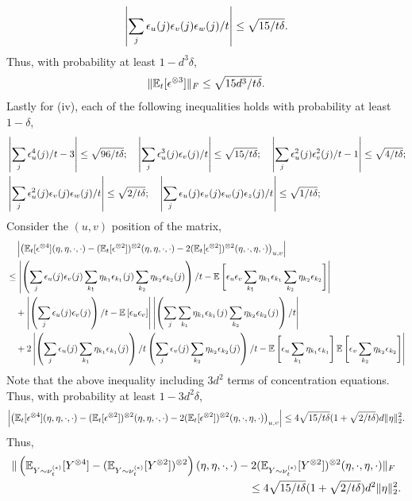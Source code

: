 \[
\left|\sum_j \epsilon_u(j)\epsilon_v(j)\epsilon_w(j)/t \right| \le \sqrt{15/t\delta}.
\]
Thus, with probability at least $1-d^3\delta$,
\[
\|\mathbb{E}_t[\epsilon^{\otimes 3}]\|_F \le \sqrt{15d^3/t\delta}.
\] 
Lastly for (iv), each of the following inequalities holds with probability at least $1-\delta$,
\begin{align*}
& \left| \sum_j\epsilon_u^4(j)/t -3 \right| \le \sqrt{96/t\delta}; \quad \left| \sum_j\epsilon_u^3(j)\epsilon_v(j)/t \right| \le \sqrt{15/t\delta}; \quad \left| \sum_j\epsilon_u^2(j)\epsilon_v^2(j)/t - 1\right| \le \sqrt{4/t\delta}; \\
&  \left| \sum_j\epsilon_u^2(j)\epsilon_v(j)\epsilon_w(j)/t \right| \le \sqrt{2/t\delta}; \quad \left| \sum_j\epsilon_u(j)\epsilon_v(j)\epsilon_w(j)\epsilon_z(j)/t \right| \le \sqrt{1/t\delta};
\end{align*}
Consider the $(u,v)$ position of the matrix,
\begin{align*}
& \quad \left|\left(\mathbb{E}_t[\epsilon^{\otimes4}](\eta,\eta,\cdot,\cdot) - (\mathbb{E}_t[\epsilon^{\otimes2}])^{\otimes 2}(\eta,\eta,\cdot,\cdot) - 2(\mathbb{E}_t[\epsilon^{\otimes2}])^{\otimes 2}(\eta,\cdot,\eta,\cdot) \right)_{u,v}\right|\\
& \le \left| \left(\sum_j \epsilon_u(j)\epsilon_v(j)\sum_{k_1}\eta_{k_1}\epsilon_{k_1}(j)\sum_{k_2}\eta_{k_2}\epsilon_{k_2}(j)\right)/t- \mathbb{E}\left[ \epsilon_{u}\epsilon_{v}\sum_{k_1}\eta_{k_1}\epsilon_{k_1}\sum_{k_2}\eta_{k_2}\epsilon_{k_2}\right]\right| \\ 
& \quad + \left| \left(\sum_j \epsilon_u(j)\epsilon_v(j)\right)/t -  \mathbb{E}\left[ \epsilon_{u}\epsilon_{v}\right]\right|\left|\left(\sum_j\sum_{k_1}\eta_{k_1}\epsilon_{k_1}(j)\sum_{k_2}\eta_{k_2}\epsilon_{k_2}(j)\right)/t \right| \\
& \quad + 2\left| \left(\sum_j \epsilon_u(j)\sum_{k_1}\eta_{k_1}\epsilon_{k_1}(j)\right)/t\left(\sum_j \epsilon_v(j)\sum_{k_2}\eta_{k_2}\epsilon_{k_2}(j)\right)/t- \mathbb{E}\left[ \epsilon_{u}\sum_{k_1}\eta_{k_1}\epsilon_{k_1}\right]\mathbb{E}\left[\epsilon_{v}\sum_{k_2}\eta_{k_2}\epsilon_{k_2}\right]\right| 
\end{align*}
Note that the above inequality including $3d^2$ terms of concentration equations. Thus, with probability at least $1-3d^2\delta$,
\[
\left|\left(\mathbb{E}_t[\epsilon^{\otimes4}](\eta,\eta,\cdot,\cdot) - (\mathbb{E}_t[\epsilon^{\otimes2}])^{\otimes 2}(\eta,\eta,\cdot,\cdot) - 2(\mathbb{E}_t[\epsilon^{\otimes2}])^{\otimes 2}(\eta,\cdot,\eta,\cdot) \right)_{u,v}\right| 
\le
4\sqrt{15/t\delta}(1+\sqrt{2/t\delta})d\|\eta\|^2_2.  
\]
Thus, 
\begin{align*}
 \| \left(\mathbb{E}_{Y\sim \nu_t^{(\epsilon)}} [Y^{\otimes4}] - (\mathbb{E}_{Y\sim \nu_t^{(\epsilon)}} [Y^{\otimes2}])^{\otimes 2}\right)(\eta,\eta,\cdot,\cdot) &  - 2 (\mathbb{E}_{Y\sim \nu_t^{(\epsilon)}} [Y^{\otimes2}])^{\otimes 2}(\eta,\cdot,\eta,\cdot)\|_F \\
& \quad \le 4\sqrt{15/t\delta}(1+\sqrt{2/t\delta})d^2\|\eta\|^2_2.
\end{align*}
